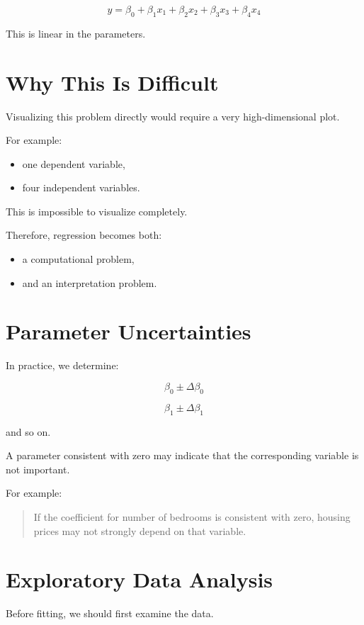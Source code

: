 \documentclass[11pt]{article}
\begin{document}
\[
y =
\beta_0
+
\beta_1 x_1
+
\beta_2 x_2
+
\beta_3 x_3
+
\beta_4 x_4
\]

This is linear in the parameters.

\section{Why This Is Difficult}

Visualizing this problem directly would require a very high-dimensional plot.

For example:

\begin{itemize}
    \item one dependent variable,
    \item four independent variables.
\end{itemize}

This is impossible to visualize completely.

Therefore, regression becomes both:

\begin{itemize}
    \item a computational problem,
    \item and an interpretation problem.
\end{itemize}

\section{Parameter Uncertainties}

In practice, we determine:

\[
\beta_0 \pm \Delta\beta_0
\]

\[
\beta_1 \pm \Delta\beta_1
\]

and so on.

A parameter consistent with zero may indicate that the corresponding variable is not important.

For example:

\begin{quote}
If the coefficient for number of bedrooms is consistent with zero, housing prices may not strongly depend on that variable.
\end{quote}

\section{Exploratory Data Analysis}

Before fitting, we should first examine the data.
\end{document}
